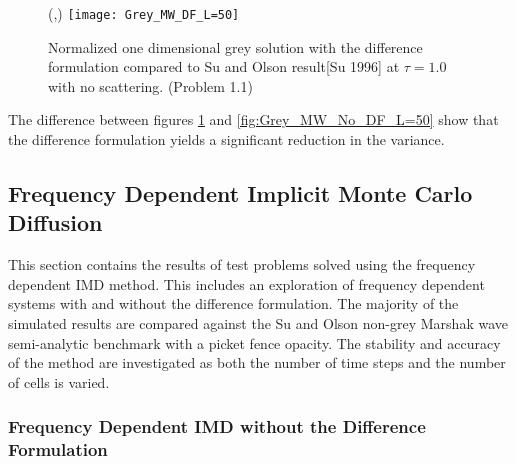 \begin{figure}[htbp]
	\begin{center}
		\begin{minipage}[t]{6in}
		\centering
		\begin{picture}(\width,\height)
	                {\texttt{[image: Grey\_MW\_DF\_L=50]}}
		\end{picture}
		\caption{\label{fig:Grey_MW_DF_L=50} Normalized one dimensional grey solution  with the difference formulation compared to Su and Olson result[Su 1996] at $\tau=1.0$ with no scattering. (Problem 1.1)}
		\end{minipage} %
	\end{center}
\end{figure}

	The difference between figures \ref{fig:Grey_MW_DF_L=50} and \ref{fig:Grey_MW_No_DF_L=50} show that the difference formulation yields a significant reduction in the variance.

\belowSubSecSkip

\subsection{Frequency Dependent Implicit Monte Carlo Diffusion}
\label{sec:Results-MM-V}

\noindent
	\indent This section contains the results of test problems solved using the frequency dependent IMD method. This includes an exploration of frequency dependent systems with and without the difference formulation. The majority of the simulated results are compared against the Su and Olson non-grey Marshak wave semi-analytic benchmark with a picket fence opacity. The stability and accuracy of the method are investigated as both the number of time steps and the number of cells is varied. 

\subsubsection{Frequency Dependent IMD without the Difference Formulation}
\label{sec:Grey_w/out_df}

